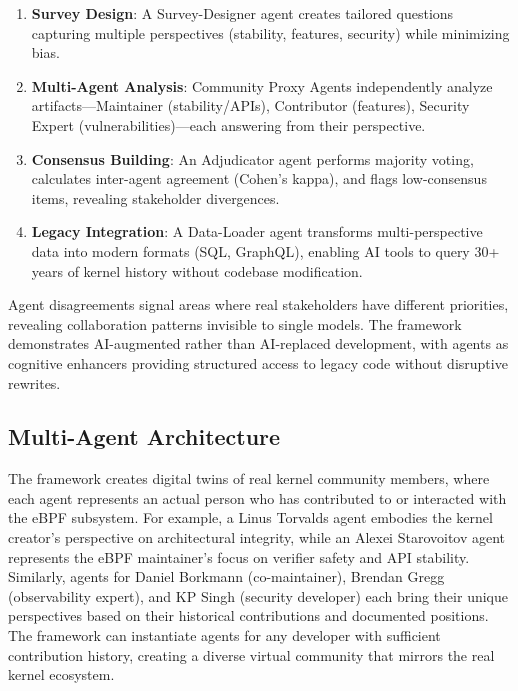 \begin{enumerate}
    \item \textbf{Survey Design}: A Survey-Designer agent creates tailored questions capturing multiple perspectives (stability, features, security) while minimizing bias.

    \item \textbf{Multi-Agent Analysis}: Community Proxy Agents independently analyze artifacts—Maintainer (stability/APIs), Contributor (features), Security Expert (vulnerabilities)—each answering from their perspective.

    \item \textbf{Consensus Building}: An Adjudicator agent performs majority voting, calculates inter-agent agreement (Cohen's kappa), and flags low-consensus items, revealing stakeholder divergences.

    \item \textbf{Legacy Integration}: A Data-Loader agent transforms multi-perspective data into modern formats (SQL, GraphQL), enabling AI tools to query 30+ years of kernel history without codebase modification.

\end{enumerate}

Agent disagreements signal areas where real stakeholders have different priorities, revealing collaboration patterns invisible to single models. The framework demonstrates AI-augmented rather than AI-replaced development, with agents as cognitive enhancers providing structured access to legacy code without disruptive rewrites.

\subsection{Multi-Agent Architecture}

The framework creates digital twins of real kernel community members, where each agent represents an actual person who has contributed to or interacted with the eBPF subsystem. For example, a Linus Torvalds agent embodies the kernel creator's perspective on architectural integrity, while an Alexei Starovoitov agent represents the eBPF maintainer's focus on verifier safety and API stability. Similarly, agents for Daniel Borkmann (co-maintainer), Brendan Gregg (observability expert), and KP Singh (security developer) each bring their unique perspectives based on their historical contributions and documented positions. The framework can instantiate agents for any developer with sufficient contribution history, creating a diverse virtual community that mirrors the real kernel ecosystem.

